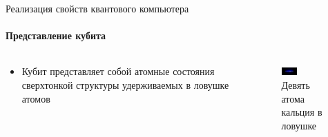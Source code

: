 \documentclass{beamer}
\begin{document}
    \begin{frame}{Реализация свойств квантового компьютера}
    \framesubtitle{Представление кубита}

        \begin{columns}

        \begin{column}{0.5\textwidth}

            \begin{itemize}
                \item Кубит представляет собой атомные состояния сверхтонкой структуры удерживаемых в ловушке атомов
            \end{itemize}

        \end{column}

        \begin{column}{0.5\textwidth}
            \begin{figure}
                \centering
                \includegraphics[width=0.35\textwidth]{media/nine-calcium-ions.jpg}
                \caption{Девять атома кальция в ловушке}
            \end{figure}
        \end{column}

        \end{columns}

    \end{frame}
\end{document}
